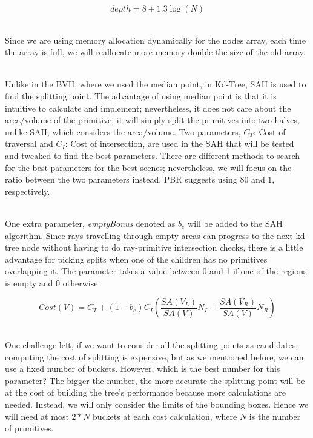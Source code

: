 \documentclass[11pt,a4paper]{article}
\begin{document}
\begin{equation}
depth = 8 + 1.3\log(N)
\label{eq:depth}
\end{equation}

\noindent
\\
Since we are using memory allocation dynamically for the nodes array, each time the array is full, we will reallocate more memory double the size of the old array.

\noindent
\\
Unlike in the BVH, where we used the median point, in Kd-Tree, SAH is used to find the splitting point. The advantage of using median point is that it is intuitive to calculate and implement; nevertheless, it does not care about the area/volume of the primitive; it will simply split the primitives into two halves, unlike SAH, which considers the area/volume. Two parameters, $C_T$: Cost of traversal and $C_I$: Cost of intersection, are used in the SAH that will be tested and tweaked to find the best parameters. There are different methods to search for the best parameters for the best scenes; nevertheless, we will focus on the ratio between the two parameters instead. PBR suggests using 80 and 1, respectively.


\noindent
\\
One extra parameter, \textit{emptyBonus} denoted as $b_e$ will be added to the SAH algorithm. Since rays travelling through empty areas can progress to the next kd-tree node without having to do ray-primitive intersection checks, there is a little advantage for picking splits when one of the children has no primitives overlapping it. The parameter takes a value between 0 and 1 if one of the regions is empty and 0 otherwise. 



\begin{equation}
Cost(V) = C_T + (1-b_e)C_I(\frac{SA(V_L)}{SA(V)}N_L + \frac{SA(V_R)}{SA(V)}N_R)
\end{equation}

\noindent
\\
One challenge left, if we want to consider all the splitting points as candidates, computing the cost of splitting is expensive, but as we mentioned before, we can use a fixed number of buckets. However, which is the best number for this parameter? The bigger the number, the more accurate the splitting point will be at the cost of building the tree's performance because more calculations are needed. Instead, we will only consider the limits of the bounding boxes. Hence we will need at most $2 * N$ buckets at each cost calculation, where $N$ is the number of primitives.
\end{document}
